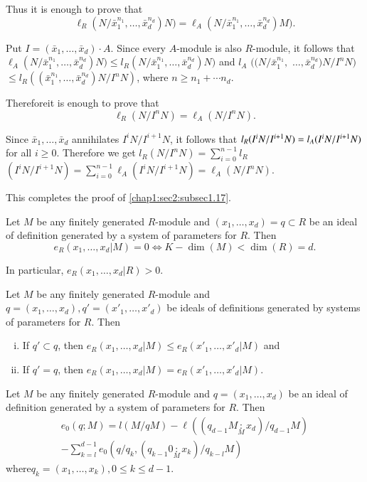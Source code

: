 Thus it is enough to prove that
$$
\ell_R(N/\bar{x}^{n_1}_1, \ldots,
\bar{x}^{n_d}_d)N)=\ell_A(N/\bar{x}^{n_1}_1, \ldots,
\bar{x}^{n_d}_d)M).  
$$

Put $I=(\bar{x}_1, \ldots, \bar{x}_d)\cdot A$. Since every $A$-module
is also $R$-module, it follows that $\ell_A(N/\bar{x}^{n_1}_1, \ldots,
\bar{x}^{n_d}_d)N)\le l_R (N/\bar{x}^{n_1}_1, \ldots,
\bar{x}^{n_d}_d)N)$ and \break $l_A$  $((N/\bar{x}^{n_1}_1,$ $\ldots,
\bar{x}^{n_d}_d)N/I^nN)$ $\le l_R((\bar{x}^{n_1}_1, \ldots,
\bar{x}^{n_d}_d)N/I^nN)$, where $n \geq n_1+ \cdots n_d$.  

Therefore\pageoriginale it is enough to prove that
$$
\ell_R(N /I^n N)=\ell_A(N/I^n N). 
$$ 


Since $\bar{x}_1, \ldots, \bar{x}_d$ annihilates $I^i N/I^{i+1}N$, it
follows that $l_R(I^i N/I^{i+1}N)\break =l_A(I^i N/I^{i+1}N)$ for all $i \ge
0$. Therefore we get $l_R(N/I^nN)=\sum \limits^{n-1}_{i=0}l_R$ $(I^i
N/I^{i+1}N)=\sum \limits^{n-1}_{i=0}
\ell_A(I^iN/I^{i+1}N)=\ell_A(N/I^nN)$.  

This completes the proof of \ref{chap1:sec2:subsec1.17}. 

\setcounter{corollary}{18}
\begin{corollary}\label{chap1:sec2:coro1.19} %
  Let $M$ be any finitely generated $R$-module and\- \hbox{$(x_1, \ldots,
    x_d) =q \subset R$} be an ideal of definition generated by a system
  of parameters for $R$. Then
  $$
  e_R(x_1, \ldots, x_d|M)=0 \Longleftrightarrow K-\dim (M) < \dim (R)=d.  
  $$
\end{corollary}

In particular, $e_R(x_1, \ldots, x_d|R)>0 $. 

\begin{corollary}\label{chap1:sec2:coro1.20}
  Let $M$ be any finitely generated $R$-module and $q=(x_1,
  \ldots, x_d), q'=(x'_1, \ldots, x'_d)$ be ideals of definitions
  generated by systems of parameters for $R$. Then 
  \begin{enumerate}[(i)]
  \item If $q' \subset q$, then $e_R(x_1, \ldots, x_d|M)\leq e_R(x'_1,
    \ldots, x'_d|M)$ and 
  \item If $q'=q$, then $e_R(x_1, \ldots, x_d|M)= e_R(x'_1, \ldots,
    x'_d|M)$.  
  \end{enumerate}
\end{corollary}

\begin{corollary}\label{chap1:sec2:coro1.21}
  Let $M$ be any finitely generated $R$-module and $q=(x_1,
  \ldots, x_d)$ be an ideal of definition generated by a system of
  parameters for $R$. Then 
  \begin{multline*}
    e_0(q;M)=l(M/qM)-\ell ((q_{d-1}M \underset{M}:x_d)/q_{d-1}M)\\
    -\sum^{d-1}_{k=l}e_0(q/q_k, (q_{k-1}0\underset{M}{:}x_k)/q_{k-l}M)   
  \end{multline*}
  where\pageoriginale \qquad $q_k=(x_1, \ldots, x_k), 0 \leq k \leq d-1$.
\end{corollary}

